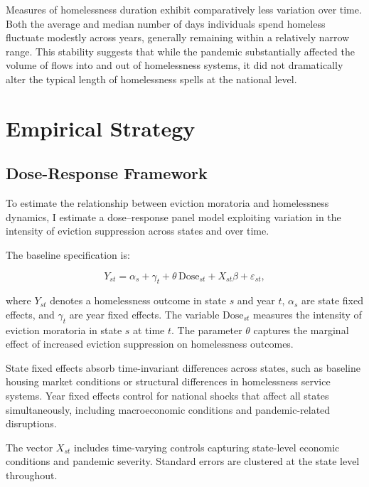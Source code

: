 \documentclass[12pt]{article}
\begin{document}
Measures of homelessness duration exhibit comparatively less variation over time. Both the average and median number of days individuals spend homeless fluctuate modestly across years, generally remaining within a relatively narrow range. This stability suggests that while the pandemic substantially affected the volume of flows into and out of homelessness systems, it did not dramatically alter the typical length of homelessness spells at the national level.

\section{Empirical Strategy}

\subsection{Dose-Response Framework}
To estimate the relationship between eviction moratoria and homelessness dynamics, I estimate a dose–response panel model exploiting variation in the intensity of eviction suppression across states and over time.

The baseline specification is:

\begin{equation}
Y_{st} = \alpha_s + \gamma_t + \theta \, \text{Dose}_{st} + X_{st}\beta + \varepsilon_{st},
\end{equation}

where $Y_{st}$ denotes a homelessness outcome in state $s$ and year $t$, $\alpha_s$ are state fixed effects, and $\gamma_t$ are year fixed effects. The variable $\text{Dose}_{st}$ measures the intensity of eviction moratoria in state $s$ at time $t$. The parameter $\theta$ captures the marginal effect of increased eviction suppression on homelessness outcomes.

State fixed effects absorb time-invariant differences across states, such as baseline housing market conditions or structural differences in homelessness service systems. Year fixed effects control for national shocks that affect all states simultaneously, including macroeconomic conditions and pandemic-related disruptions.

The vector $X_{st}$ includes time-varying controls capturing state-level economic conditions and pandemic severity. Standard errors are clustered at the state level throughout.
\end{document}
